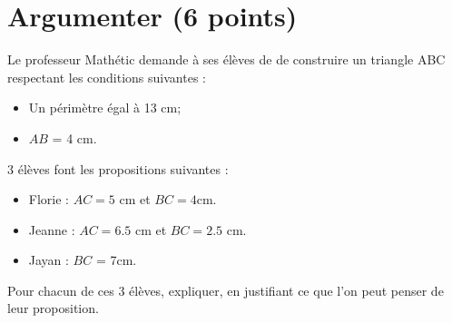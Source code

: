 \section{Argumenter (6 points)}

Le professeur Mathétic demande à ses élèves de  de construire un triangle ABC respectant les conditions suivantes :

\begin{itemize}
	\item Un périmètre égal à 13 cm;
	\item $AB$ = 4 cm.
\end{itemize}

3 élèves font les propositions suivantes :
\begin{itemize}
	\item Florie : $AC = 5$ cm et $BC= \num{4}$cm.
	\item Jeanne :  $AC = \num{6.5}$ cm et $BC= \num{2.5}$ cm.
	\item Jayan : $BC$ = 7cm.
\end{itemize}

\begin{questions}
	\question[6] Pour chacun de ces 3 élèves, expliquer, en justifiant ce que l'on peut penser de leur proposition.
\end{questions}